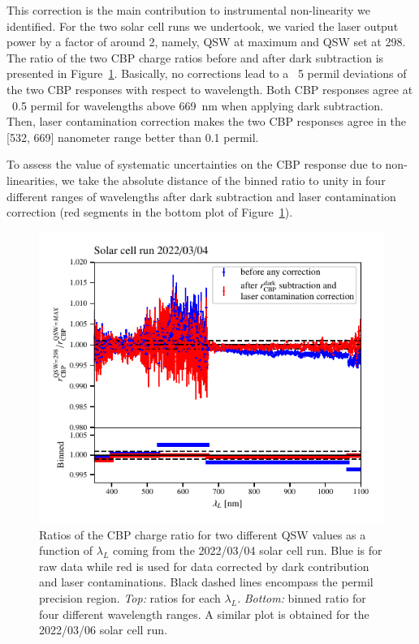 This correction is the main contribution to instrumental non-linearity we identified. For the two solar cell runs we undertook, we varied the laser output power by a factor of around 2, namely, QSW at maximum and QSW set at 298. The ratio of the two CBP charge ratios before and after dark subtraction is presented in Figure~\ref{fig:SCqswlinearity}. Basically, no corrections lead to a ~5 permil deviations of the two CBP responses with respect to wavelength. Both CBP responses agree at ~0.5 permil for wavelengths above \SI{669}{\nano\meter} when applying dark subtraction. Then, laser contamination correction makes the two CBP responses agree in the [532, 669] nanometer range better than 0.1 permil. 

To assess the value of systematic uncertainties on the CBP response due to non-linearities, we take the absolute distance of the binned ratio to unity in four different ranges of wavelengths after dark subtraction and laser contamination correction (red segments in the bottom plot of Figure~\ref{fig:SCqswlinearity}).

\begin{figure}[h]
    \centering
    \includegraphics[width=\columnwidth]{fig/sc_qsw_ratios.pdf}
    \caption{Ratios of the CBP charge ratio for two different QSW values as a function of $\lambda_L$ coming from the 2022/03/04 solar cell run. Blue is for raw data while red is used for data corrected by dark contribution and laser contaminations. Black dashed lines encompass the permil precision region. \textit{Top:} ratios for each $\lambda_L$. \textit{Bottom:} binned ratio for four different wavelength ranges. A similar plot is obtained for the 2022/03/06 solar cell run.}
    \label{fig:SCqswlinearity}    
\end{figure}


